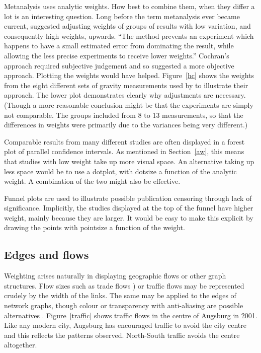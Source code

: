 \documentclass{svmult}
\begin{document}

Metanalysis uses analytic weights.  How best to combine them, when they differ a lot is an interesting question.  Long before the term metanalysis ever became current, \cite{cochran:1954b} suggested adjusting weights of groups of results with low variation, and consequently high weights, upwards.  ``The method prevents an experiment which happens to have a small estimated error from dominating the result, while allowing the less precise experiments to receive lower weights.''  Cochran's approach required subjective judgement and so \cite{mosteller:1982} suggested a more objective approach.  Plotting the weights would have helped.  Figure~\ref{hc} shows the weights from the eight different sets of gravity measurements used by \cite{mosteller:1982} to illustrate their approach.  The lower plot demonstrates clearly why adjustments are necessary.  (Though a more reasonable conclusion might be that the experiments are simply not comparable.  The groups included from $8$ to $13$ measurements, so that the differences in weights were primarily due to the variances being very different.)

Comparable results from many different studies are often displayed in a forest plot of parallel confidence intervals.  As mentioned in Section~\ref{aw}, this means that studies with low weight take up more visual space.  An alternative taking up less space would be to use a dotplot, with dotsize a function of the analytic weight.  A combination of the two might also be effective.

Funnel plots are used to illustrate possible publication censoring through lack of significance.  Implicitly, the studies displayed at the top of the funnel have higher weight, mainly because they are larger.  It would be easy to make this explicit by drawing the points with pointsize a function of the weight.

\subsection{Edges and flows}
\label{edge}
Weighting arises naturally in displaying geographic flows or other graph structures.  Flow sizes such as trade flows \citep{unwin:1992}) or traffic flows may be represented crudely by the width of the links.  The same may be applied to the edges of network graphs, though colour or transparency with anti-aliasing are possible alternatives \citep{wills:2006}.  Figure~\ref{traffic} shows traffic flows in the centre of Augsburg in 2001.   Like any modern city, Augsburg has encouraged traffic to avoid the city centre and this reflects the patterns observed.  North-South traffic avoids the centre altogether.
\end{document}
